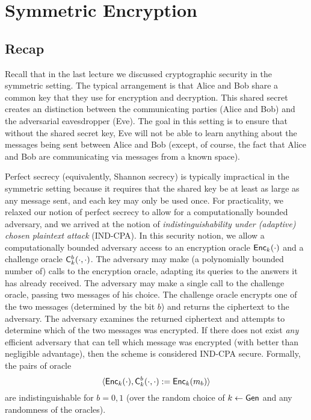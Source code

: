 \documentclass[11pt]{article}
\begin{document}
\thispagestyle{fancy}          %


\newcommand{\challenge}{\algo{C}}

\section{Symmetric Encryption}
\label{sec:symm-encrypt}

\subsection{Recap}
\label{sec:recap}

Recall that in the last lecture we discussed cryptographic security in
the symmetric setting.  The typical arrangement is that Alice and Bob
share a common key that they use for encryption and decryption.  This
shared secret creates an distinction between the communicating parties
(Alice and Bob) and the adversarial eavesdropper (Eve).  The goal in
this setting is to ensure that without the shared secret key, Eve will
not be able to learn anything about the messages being sent between
Alice and Bob (except, of course, the fact that Alice and Bob are
communicating via messages from a known space).

Perfect secrecy (equivalently, Shannon secrecy) is typically
impractical in the symmetric setting because it requires that the
shared key be at least as large as any message sent, and each key may
only be used once.  For practicality, we relaxed our notion of perfect
secrecy to allow for a computationally bounded adversary, and we
arrived at the notion of \emph{indistinguishability under (adaptive)
  chosen plaintext attack} (IND-CPA).  In this security notion, we
allow a computationally bounded adversary access to an encryption
oracle $\mathsf{Enc}_{k}(\cdot)$ and a challenge oracle
$\challenge_{k}^{b}(\cdot, \cdot)$. The adversary may make (a
polynomially bounded number of) calls to the encryption oracle,
adapting its queries to the answers it has already received.  The
adversary may make a single call to the challenge oracle, passing two
messages of his choice.  The challenge oracle encrypts one of the two
messages (determined by the bit $b$) and returns the ciphertext to the
adversary.  The adversary examines the returned ciphertext and
attempts to determine which of the two messages was encrypted.  If
there does not exist \emph{any} efficient adversary that can tell
which message was encrypted (with better than negligible advantage),
then the scheme is considered IND-CPA secure.  Formally, the pairs of
oracle \[ \langle \skcenc_{k}(\cdot), \challenge_{k}^{b}(\cdot, \cdot)
:= \skcenc_{k}(m_{b}) \rangle \] are indistinguishable for $b = 0,1$
(over the random choice of $k \gets \mathsf{Gen}$ and any randomness of the
oracles).
\end{document}
